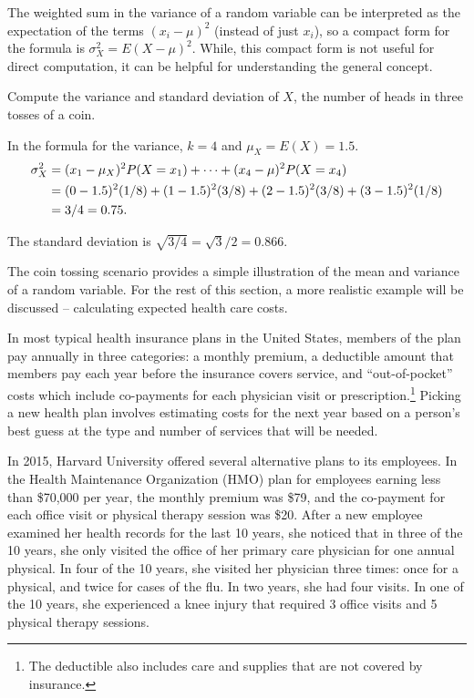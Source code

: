 The weighted sum in the variance of a random variable can be interpreted as the expectation of the terms $(x_i - \mu)^2$ (instead of just $x_i$), so a compact form for the formula is $\sigma_X^2 = E(X - \mu)^2$. While, this compact form is not useful for direct computation, it can be helpful for understanding the general concept. 

\newpage

\begin{example}{Compute the variance and standard deviation of $X$, the number of heads in three tosses of a coin.}
    
    In the formula for the variance, $k = 4$ and $\mu_X = E(X) = 1.5$. 
    \begin{align*}
    \sigma_X^2 &= (x_1-\mu_X)^2P(X=x_1) + \cdots \notag + (x_4-\mu)^2 P(X=x_4) \notag \\
    	&= (0- 1.5)^2(1/8) + (1 - 1.5)^2 (3/8) + 
        (2 -1.5)^2 (3/8) + (3-1.5)^2 (1/8) \notag \\
        &= 3/4 = 0.75.
    \end{align*}
    
The standard deviation is $\sqrt{3/4} = \sqrt{3}/2 = 0.866$.  

\end{example}

The coin tossing scenario provides a simple illustration of the mean and variance of a random variable. For the rest of this section, a more realistic example will be discussed -- calculating expected health care costs.

\label{healthCareCostsEmployee}
In most typical health insurance plans in the United States, members of the plan pay annually in three categories: a monthly premium, a deductible amount that members pay each year before the insurance covers service, and ``out-of-pocket'' costs which include co-payments for each physician visit or prescription.\footnote{The deductible also includes care and supplies that are not covered by insurance.} Picking a new health plan involves estimating costs for the next year based on a person's best guess at the type and number of services that will be needed.
	
In 2015, Harvard University offered several alternative plans to its employees. In the Health Maintenance Organization (HMO) plan for employees earning less than \$70,000 per year, the monthly premium was \$79, and the co-payment for each office visit or physical therapy session was \$20. After a new employee examined her health records for the last 10 years, she noticed that in three of the 10 years, she only visited the office of her primary care physician  for one annual physical. In four of the 10 years, she visited her physician three times: once for a physical, and twice for cases of the flu. In two years, she had four visits. In one of the 10 years, she experienced a knee injury that required 3 office visits and 5 physical therapy sessions.

